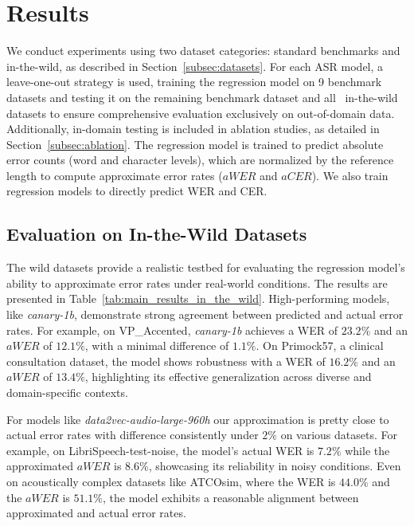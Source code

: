 \section{Results}\label{sec:results}


We conduct experiments using two dataset categories: standard benchmarks and in-the-wild, as described in Section~\ref{subsec:datasets}. For each ASR model, a leave-one-out strategy is used, training the regression model on 9 benchmark datasets and testing it on the remaining benchmark dataset and all {\nwilds}~in-the-wild datasets to ensure comprehensive evaluation exclusively on out-of-domain data. Additionally, in-domain testing is included in ablation studies, as detailed in Section~\ref{subsec:ablation}. The regression model is trained to predict absolute error counts (word and character levels), which are normalized by the reference length to compute approximate error rates (\(aWER\) and \(aCER\)). We also train regression models to directly predict WER and CER. 




\subsection{Evaluation on In-the-Wild Datasets}\label{subsec:wild_eval}



The wild datasets provide a realistic testbed for evaluating the regression model's ability to approximate error rates under real-world conditions. The results are presented in Table~\ref{tab:main_results_in_the_wild}. High-performing models, like \textit{canary-1b}, demonstrate strong agreement between predicted and actual error rates. For example, on VP\_Accented, \textit{canary-1b} achieves a WER of \(23.2\%\) and an \(aWER\) of \(12.1\%\), with a minimal difference of \(1.1\%\). On Primock57, a clinical consultation dataset, the model shows robustness with a WER of \(16.2\%\) and an \(aWER\) of \(13.4\%\), highlighting its effective generalization across diverse and domain-specific contexts.



For models like \textit{data2vec-audio-large-960h} our approximation is pretty close to actual error rates with difference consistently under \(2\%\) on various datasets. For example, on LibriSpeech-test-noise, the model's actual WER is \(7.2\%\) while the approximated \(aWER\) is \(8.6\%\), showcasing its reliability in noisy conditions. Even on acoustically complex datasets like ATCOsim, where the WER is \(44.0\%\) and the \(aWER\) is \(51.1\%\), the model exhibits a reasonable alignment between approximated and actual error rates.




